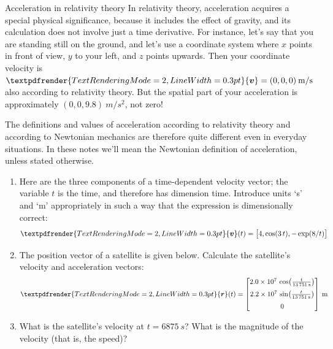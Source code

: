 \documentclass[a4paper,12pt,%
onecolumn,oneside,titlepage,%
british%
]{memoir}
\renewcommand*{\bm}[1]{\textpdfrender{TextRenderingMode=2,LineWidth=0.3pt}{\boldsymbol{#1}}}
\renewcommand*{\|}[1][]{\nonscript\:#1\vert\nonscript\:\mathopen{}}
\newcommand*{\yr}{\bm{r}}
\newcommand*{\yv}{\bm{v}}
\begin{document}
\begin{extra}{Acceleration in relativity theory}
  In relativity theory, acceleration acquires a special physical significance, because it includes the effect of gravity, and its calculation does not involve just a time derivative. For instance, let's say that you are standing still on the ground, and let's use a coordinate system where $x$ points in front of view, $y$ to your left, and $z$ points upwards. Then your coordinate velocity is $\yv=(0,0,0)\:\unit{m/s}$ also according to relativity theory. But the spatial part of your acceleration is approximately $(0,0,9.8)\:\unit{m/s^{2}}$, not zero!

  The definitions and values of acceleration according to relativity theory and according to Newtonian mechanics are therefore quite different even in everyday situations. In these notes we'll mean the Newtonian definition of acceleration, unless stated otherwise.
\end{extra}

\medskip

\begin{exercise}
  \begin{enumerate}[exerc]
  \item Here are the three components of a time-dependent velocity vector; the variable $t$ is the time, and therefore has dimension \textsf{time}. Introduce units \enquote*{\unit{s}} and \enquote*{\unit{m}} appropriately in such a way that the expression is dimensionally correct:
    \begin{equation*}
      \bm{v}(t) = \bigl[4, \cos(3\,t), -\exp(8/t)\bigr]
    \end{equation*}
  \item The position vector of a satellite is given below. Calculate the satellite's velocity and acceleration vectors:
    \begin{equation*}
      \yr(t) =
      \begin{bmatrix}
        \num[exponent-mode=scientific]{20e+6}\,
        \cos\bigl(\frac{t}{\qty{13751}{s}}\bigr)\\[2\jot]
        \num[exponent-mode=scientific]{22e+6}\,
        \sin\bigl(\frac{t}{\qty{13751}{s}}\bigr)\\[2\jot]
        \num{0}
      \end{bmatrix}\:\unit{m}
    \end{equation*}
  \item What is the satellite's velocity at $t=\qty{6875}{s}$? What is the magnitude of the velocity (that is, the speed)?
  \end{enumerate}
\end{exercise}
\end{document}
